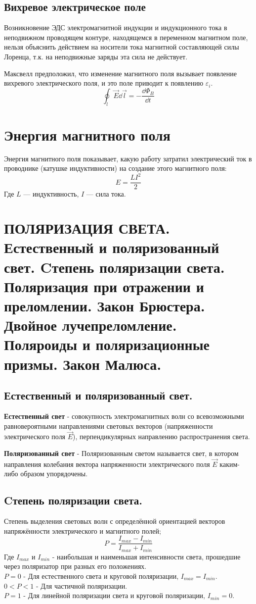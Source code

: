 \documentclass[12pt]{report}
\begin{document}
\subsection{Вихревое электрическое поле}
Возникновение ЭДС электромагнитной индукции и индукционного тока в неподвижном проводящем контуре, находящемся в переменном магнитном поле, нельзя объяснить действием на носители тока магнитной составляющей силы Лоренца, т.к. на неподвижные заряды эта сила не действует.

Максвелл предположил, что изменение магнитного поля вызывает появление вихревого электрического поля, и это поле приводит к появлению $\varepsilon_i$.
\[
    \oint_l \vec{E} \dd{\vec{l}} = -\dfrac{\dd{\Phi_B}}{\dd{t}}
\]

\section{Энергия магнитного поля}
Энергия магнитного поля показывает, какую работу затратил электрический ток в проводнике (катушке индуктивности) на создание этого магнитного поля:
\[
    E = \dfrac{L I^2}{2}
\]
Где $L$ --- индуктивность, $I$ --- сила тока.

\setcounter{section}{29}
\section{ПОЛЯРИЗАЦИЯ СВЕТА. Естественный и поляризованный свет. Cтепень поляризации света. Поляризация при отражении и преломлении. Закон Брюстера. Двойное лучепреломление. Поляроиды и поляризационные призмы. Закон Малюса.}
\subsection{  Естественный и поляризованный свет.}
\textbf{Естественный свет} - совокупность электромагнитных волн со всевозможными равновероятными направлениями световых векторов (напряженности электрического поля $\overrightarrow{E}$), перпендикулярных направлению распространения света.

\textbf{Поляризованный свет} -  Поляризованным светом называется свет, в котором направления колебания вектора напряженности электрического поля $\overrightarrow{E}$  каким-либо образом упорядочены.
\subsection{  Cтепень поляризации света.}
Степень выделения световых волн с определённой ориентацией векторов напряжённости электрического и магнитного полей;
\[P=\frac{I_{max}-I_{min}}{I_{max}+I_{min}}\]
Где $I_{max}$ и $I_{min}$ - наибольшая и наименьшая интенсивности света, прошедшие через поляризатор при разных его положениях.\\
$P=0$ - Для естественного света и круговой поляризации, $I_{max}=I_{min}$.\\
$0<P<1$ - Для частичной поляризации.\\
$P=1$ - Для  линейной поляризации света и круговой поляризации,  $I_{min}=0$.
\end{document}
